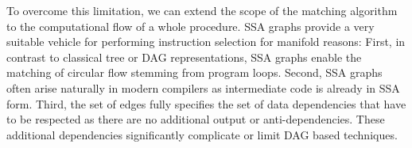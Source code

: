 To overcome this limitation, we can extend the scope of the matching
algorithm to the computational flow of a whole procedure. SSA graphs
provide a very suitable vehicle for performing instruction selection for
manifold reasons:  First, in
contrast to classical tree or DAG representations, SSA graphs enable
the matching of circular flow stemming from program loops.
Second, SSA graphs often arise naturally in modern
compilers as intermediate code is already in SSA form. Third, the
set of edges fully specifies the set of data dependencies that have to
be respected as there are no additional output or
anti-dependencies. These additional dependencies significantly
complicate or limit DAG based techniques.

\begin{figure}
  \begin{center}





\end{center}
\end{figure}
